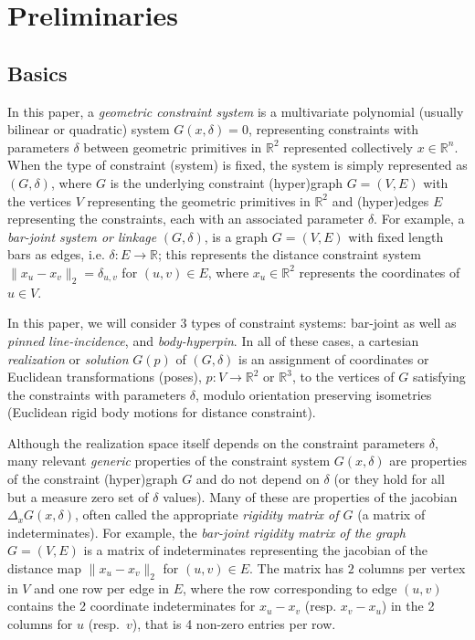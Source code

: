 \section{Preliminaries}
\label{sec:prelim}

\subsection{Basics}



In this paper, a {\em geometric constraint system} is a multivariate polynomial 
(usually bilinear or quadratic) system $G(x,\delta)=0$, representing constraints with parameters $\delta$ 
between geometric primitives  in $\mathbb{R}^2$ represented collectively $x\in \mathbb{R}^n$.   
%
When the type of constraint (system) is fixed, the system is simply represented as $(G,\delta)$, where 
$G$ is the underlying constraint (hyper)graph $G = (V,E)$ 
with the vertices $V$ representing the geometric primitives in 
$\mathbb{R}^2$ and (hyper)edges
$E$ representing the constraints, each with an associated 
parameter $\delta$.
%
For example, a {\em bar-joint system or linkage} $(G,\delta)$, is a graph
$G=(V,E)$  
with fixed length bars as edges, i.e. $\delta: E \rightarrow \mathbb{R}$;
this represents the distance constraint system $\| x_u -x_v \|_2 =
\delta_{u,v}$ for  $(u,v) \in E$, where $x_u \in \mathbb{R}^2$ represents the coordinates of
$u\in V$. 

In this paper, we will consider 3 types of constraint systems: bar-joint
as well as {\em pinned line-incidence}, and {\em body-hyperpin}. 
In all of these cases, a cartesian \emph{realization} or 
\emph{solution} $G(p)$ of $(G,\delta)$ is 
an assignment of coordinates or Euclidean transformations (poses), 
$p: V \rightarrow \mathbb{R}^2$ or $\mathbb{R}^3$, to the vertices of $G$ satisfying the 
constraints with parameters $\delta$, 
modulo orientation preserving isometries 
(Euclidean rigid body motions for distance constraint). 

Although the realization space itself depends on the constraint parameters 
$\delta$, many  relevant {\em generic} properties of 
the constraint system $G(x,\delta)$
are properties of the constraint (hyper)graph $G$ 
and do not depend on $\delta$ (or they hold for all but a measure 
zero set of $\delta$
values). Many of these are properties of the jacobian 
$\Delta_x G(x,\delta)$, often called the appropriate {\em rigidity matrix of
$G$} 
(a matrix of indeterminates).
For example, the {\em bar-joint rigidity matrix 
of the graph $G = (V,E)$}
is a matrix of indeterminates representing the 
jacobian of the distance map 
$\| x_u -x_v \|_2$  for $(u,v) \in E$.
The matrix has $2$ columns per vertex in $V$ and one row per edge  in $E$, 
where the row corresponding to edge $(u,v)$ contains the 2 coordinate indeterminates 
for $x_u -x_v$ (resp. $x_v-x_u$) in the 2 columns for $u$ (resp.\ $v$), 
that is 4 non-zero entries per row. 

